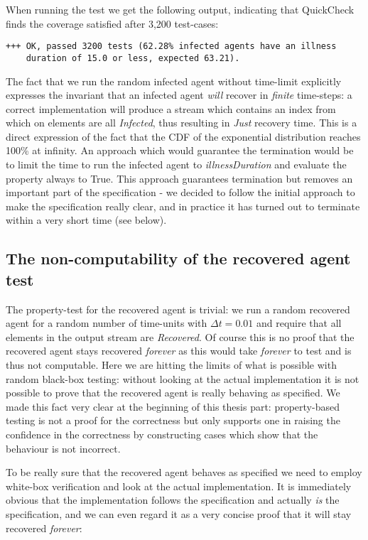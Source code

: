 When running the test we get the following output, indicating that QuickCheck finds the coverage satisfied after 3,200 test-cases:

\begin{verbatim}
+++ OK, passed 3200 tests (62.28% infected agents have an illness 
    duration of 15.0 or less, expected 63.21).
\end{verbatim}

The fact that we run the random infected agent without time-limit explicitly expresses the invariant that an infected agent \textit{will} recover in \textit{finite} time-steps: a correct implementation will produce a stream which contains an index from which on elements are all \textit{Infected}, thus resulting in \textit{Just} recovery time. This is a direct expression of the fact that the CDF of the exponential distribution reaches 100\% at infinity. An approach which would guarantee the termination would be to limit the time to run the infected agent to \textit{illnessDuration} and evaluate the property always to True. This approach guarantees termination but removes an important part of the specification - we decided to follow the initial approach to make the specification really clear, and in practice it has turned out to terminate within a very short time (see below).

\subsection{The non-computability of the recovered agent test}
The property-test for the recovered agent is trivial: we run a random recovered agent for a random number of time-units with $\Delta t = 0.01$ and require that all elements in the output stream are \textit{Recovered}. Of course this is no proof that the recovered agent stays recovered \textit{forever} as this would take \textit{forever} to test and is thus not computable.  Here we are hitting the limits of what is possible with random black-box testing: without looking at the actual implementation it is not possible to prove that the recovered agent is really behaving as specified. We made this fact very clear at the beginning of this thesis part: property-based testing is not a proof for the correctness but only supports one in raising the confidence in the correctness by constructing cases which show that the behaviour is not incorrect.

To be really sure that the recovered agent behaves as specified we need to employ white-box verification and look at the actual implementation. It is immediately obvious that the implementation follows the specification and actually \textit{is} the specification, and we can even regard it as a very concise proof that it will stay recovered \textit{forever}:

